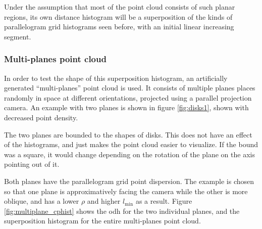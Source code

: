 Under the assumption that most of the point cloud consists of such planar regions, its own distance histogram will be a superposition of the kinds of parallelogram grid histograms seen before, with an initial linear increasing segment.

\subsubsection{Multi-planes point cloud}
In order to test the shape of this superposition histogram, an artificially generated ``multi-planes'' point cloud is used. It consists of multiple planes places randomly in space at different orientations, projected using a parallel projection camera. An example with two planes is shown in figure \ref{fig:disks1}, shown with decreased point density.

The two planes are bounded to the shapes of disks. This does not have an effect of the histograms, and just makes the point cloud easier to visualize. If the bound was a square, it would change depending on the rotation of the plane on the axis pointing out of it.

Both planes have the parallelogram grid point dispersion. The example is chosen so that one plane is approximatively facing the camera while the other is more oblique, and has a lower $\rho$ and higher $l_\text{min}$ as a result. Figure \ref{fig:multiplane_cphist} shows the \gls{odh} for the two individual planes, and the superposition histogram for the entire multi-planes point cloud.

